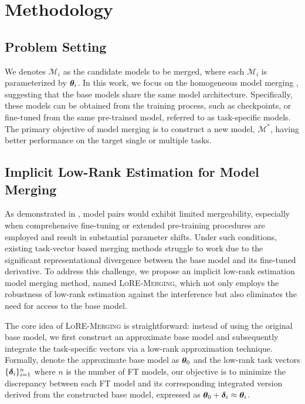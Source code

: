 \section{Methodology}
\subsection{Problem Setting}

We denotes $\mathcal{M}_i$ as the candidate models to be merged, where each $\mathcal{M}_i$ is parameterized by $\bm{\theta}_i$. 
In this work, we focus on the homogeneous model merging \citep{wortsman_2022_model, ilharco_2022_editing, yadav_2024_ties}, suggesting that the base models share the same model architecture. Specifically, these models can be obtained from the training process, such as checkpoints, or fine-tuned from the same pre-trained model, referred to as task-specific models.
The primary objective of model merging is to construct a new model, $\mathcal{M}^*$, having better performance on the target single or multiple tasks.

\subsection{Implicit Low-Rank Estimation for Model Merging}
As demonstrated in \citet{yu_2024_language, yu2024extend}, model pairs would exhibit limited mergeability, especially when comprehensive fine-tuning or extended pre-training procedures are employed and result in substantial parameter shifts.
Under such conditions, existing task-vector based merging methods struggle to work due to the significant representational divergence between the base model and its fine-tuned derivative. To address this challenge, we propose an implicit low-rank estimation model merging method, named \textsc{LoRE-Merging}, which not only employs the robustness of low-rank estimation against the interference but also eliminates the need for access to the base model.

The core idea of \textsc{LoRE-Merging} is straightforward: instead of using the original base model, we first construct an approximate base model and subsequently integrate the task-specific vectors via a low-rank approximation technique.
Formally, denote the approximate base model as $\bm{\theta}_0$ and the low-rank task vectors $\{ \bm{\delta}_i \}_{i=1}^n$ where $n$ is the number of FT models, our objective is to minimize the discrepancy between each FT model and its corresponding integrated version derived from the constructed base model, expressed as $\bm{\theta}_0 + \bm{\delta}_i \approx \bm{\theta}_i$.

